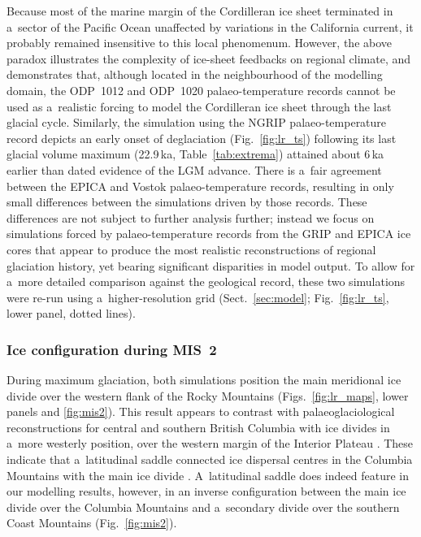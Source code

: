 \documentclass[tc, manuscript]{copernicus}
\begin{document}
      Because most of the marine margin of the Cordilleran ice sheet
      terminated in a~sector of the Pacific Ocean unaffected by variations
      in the California current, it probably remained insensitive to this
      local phenomenum. However, the above paradox illustrates the
      complexity of ice-sheet feedbacks on regional climate, and
      demonstrates that, although located in the neighbourhood of the
      modelling domain, the ODP~1012 and ODP~1020 palaeo-temperature records
      cannot be used as a~realistic forcing to model the Cordilleran ice
      sheet through the last glacial cycle. Similarly, the simulation using
      the NGRIP palaeo-temperature record depicts an early onset of
      deglaciation (Fig.~\ref{fig:lr_ts}) following its last glacial volume
      maximum (22.9\,\unit{ka}, Table~\ref{tab:extrema}) attained about
      6\,\unit{ka} earlier than dated evidence of the LGM advance. There is
      a~fair agreement between the EPICA and Vostok palaeo-temperature
      records, resulting in only small differences between the simulations
      driven by those records. These differences are not subject to further
      analysis further; instead we focus on simulations forced by
      palaeo-temperature records from the GRIP and EPICA ice cores that
      appear to produce the most realistic reconstructions of regional
      glaciation history, yet bearing significant disparities in model
      output. To allow for a~more detailed comparison against the geological
      record, these two simulations were re-run using a~higher-resolution
      grid (Sect.~\ref{sec:model}; Fig.~\ref{fig:lr_ts}, lower panel, dotted
      lines).


\subsubsection{Ice configuration during MIS~2}
\label{sec:mis2}

      During maximum glaciation, both simulations position the main
      meridional ice divide over the western flank of the Rocky Mountains
      (Figs.~\ref{fig:lr_maps}, lower panels and \ref{fig:mis2}). This
      result appears to contrast with palaeoglaciological reconstructions
      for central and southern British Columbia with ice divides in a~more
      westerly position, over the western margin of the Interior Plateau
      \citep{Ryder.etal.1991, Stumpf.etal.2000, Kleman.etal.2010,
      Clague.Ward.2011, Margold.etal.2013a}. These indicate that
      a~latitudinal saddle connected ice dispersal centres in the Columbia
      Mountains with the main ice divide \citep{Ryder.etal.1991,
      Kleman.etal.2010, Clague.Ward.2011, Margold.etal.2013a}. A~latitudinal
      saddle does indeed feature in our modelling results, however, in an
      inverse configuration between the main ice divide over the Columbia
      Mountains and a~secondary divide over the southern Coast Mountains
      (Fig.~\ref{fig:mis2}).
\end{document}
